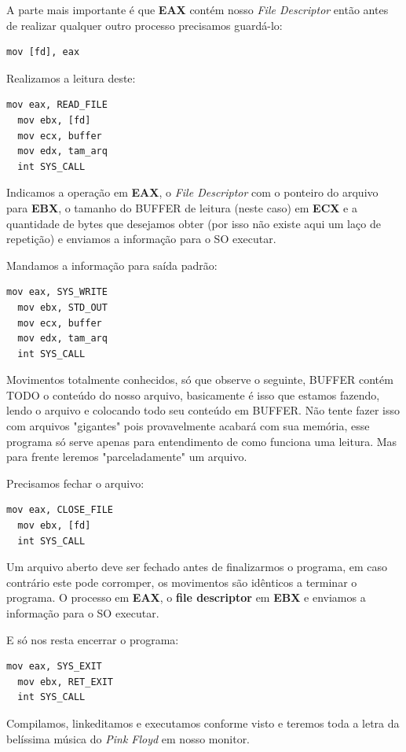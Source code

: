 A parte mais importante é que \textbf{EAX} contém nosso \textit{File Descriptor} então antes de realizar qualquer outro processo precisamos guardá-lo:
\begin{lstlisting}[]
  mov [fd], eax	
\end{lstlisting}	

Realizamos a leitura deste:
\begin{lstlisting}[]
  mov eax, READ_FILE
  mov ebx, [fd]
  mov ecx, buffer
  mov edx, tam_arq
  int SYS_CALL	
\end{lstlisting}	

Indicamos a operação em \textbf{EAX}, o \textit{File Descriptor} com o ponteiro do arquivo para \textbf{EBX}, o tamanho do BUFFER de leitura (neste caso) em \textbf{ECX} e a quantidade de bytes que desejamos obter (por isso não existe aqui um laço de repetição) e enviamos a informação para o SO executar.

Mandamos a informação para saída padrão:
\begin{lstlisting}[]
  mov eax, SYS_WRITE
  mov ebx, STD_OUT
  mov ecx, buffer
  mov edx, tam_arq
  int SYS_CALL	
\end{lstlisting}	

Movimentos totalmente conhecidos, só que observe o seguinte, BUFFER contém TODO o conteúdo do nosso arquivo, basicamente é isso que estamos fazendo, lendo o arquivo e colocando todo seu conteúdo em BUFFER. Não tente fazer isso com arquivos "gigantes" pois provavelmente acabará com sua memória, esse programa só serve apenas para entendimento de como funciona uma leitura. Mas para frente leremos "parceladamente" um arquivo.

Precisamos fechar o arquivo:
\begin{lstlisting}[]
  mov eax, CLOSE_FILE
  mov ebx, [fd]
  int SYS_CALL	
\end{lstlisting}	

Um arquivo aberto deve ser fechado antes de finalizarmos o programa, em caso contrário este pode corromper, os movimentos são idênticos a terminar o programa. O processo em \textbf{EAX}, o \textbf{file descriptor} em \textbf{EBX} e enviamos a informação para o SO executar.

E só nos resta encerrar o programa:
\begin{lstlisting}[]
  mov eax, SYS_EXIT
  mov ebx, RET_EXIT
  int SYS_CALL	
\end{lstlisting}	

Compilamos, linkeditamos e executamos conforme visto e teremos toda a letra da belíssima música do \textit{Pink Floyd} em nosso monitor.
\clearpage